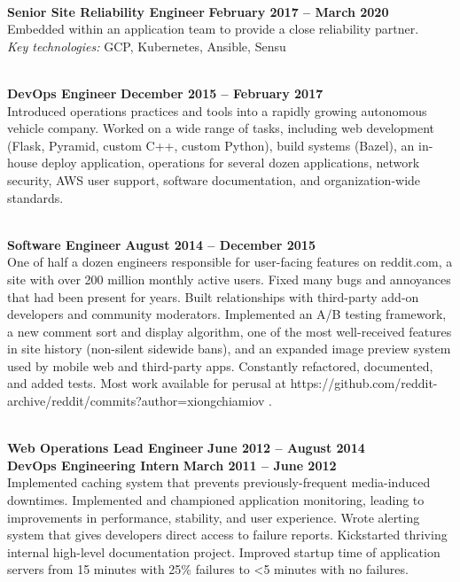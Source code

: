 \documentclass[margin,line]{resume}
\begin{document}
\begin{resume}
    \vspace{1mm}\\%
    \textbf{Senior Site Reliability Engineer} \hfill \textbf{February 2017 -- March 2020}\\
    Embedded within an application team to provide a close reliability partner.\\
    \textit{Key technologies:} GCP, Kubernetes, Ansible, Sensu

    \vspace{1mm}\\%
    \textbf{DevOps Engineer} \hfill \textbf{December 2015 -- February 2017}\\
    Introduced operations practices and tools into a rapidly growing autonomous vehicle company.
    Worked on a wide range of tasks, including web development (Flask, Pyramid, custom C++, custom Python), build systems (Bazel), an in-house deploy application, operations for several dozen applications, network security, AWS user support, software documentation, and organization-wide standards.

    \vspace{1mm}\\%
    \textbf{Software Engineer} \hfill \textbf{August 2014 -- December 2015}\\
    One of half a dozen engineers responsible for user-facing features on reddit.com, a site with over 200 million monthly active users.
    Fixed many bugs and annoyances that had been present for years.
    Built relationships with third-party add-on developers and community moderators.
    Implemented an A/B testing framework, a new comment sort and display algorithm, one of the most well-received features in site history (non-silent sidewide bans), and an expanded image preview system used by mobile web and third-party apps.
    Constantly refactored, documented, and added tests.
    Most work available for perusal at https://github.com/reddit-archive/reddit/commits?author=xiongchiamiov .

    \vspace{1mm}\\%
    \textbf{Web Operations Lead Engineer} \hfill \textbf{June 2012 -- August 2014}\\
    \textbf{DevOps Engineering Intern} \hfill \textbf{March 2011 -- June 2012}\\
    Implemented caching system that prevents previously-frequent media-induced downtimes.
    Implemented and championed application monitoring, leading to improvements in performance, stability, and user experience.
    Wrote alerting system that gives developers direct access to failure reports.
    Kickstarted thriving internal high-level documentation project.
    Improved startup time of application servers from 15 minutes with 25\% failures to \textless5 minutes with no failures.


\end{resume}
\end{document}
